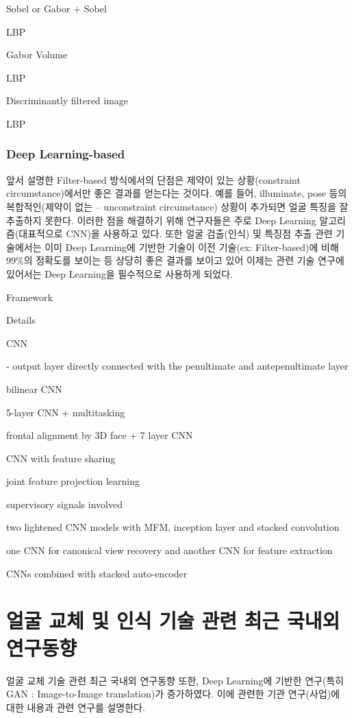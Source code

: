 \documentclass{oblivoir}
\begin{document}
Sobel or Gabor + Sobel

LBP

Gabor Volume

LBP

Discriminantly filtered image

LBP

\subsubsection{ Deep Learning-based}

앞서 설명한 Filter-based 방식에서의 단점은 제약이 있는 상황(constraint circumstance)에서만 좋은 결과를 얻는다는 것이다. 예를 들어, illuminate, pose 등의 복합적인(제약이 없는 – unconstraint circumstance) 상황이 추가되면 얼굴 특징을 잘 추출하지 못한다. 이러한 점을 해결하기 위해 연구자들은 주로 Deep Learning 알고리즘(대표적으로 CNN)을 사용하고 있다. 또한 얼굴 검출(인식) 및 특징점 추출 관련 기술에서는 이미 Deep Learning에 기반한 기술이 이전 기술(ex: Filter-based)에 비해 99\%의 정확도를 보이는 등 상당히 좋은 결과를 보이고 있어 이제는 관련 기술 연구에 있어서는 Deep Learning을 필수적으로 사용하게 되었다.

Framework

Details

CNN

- output layer directly connected with the penultimate and antepenultimate layer

bilinear CNN

5-layer CNN + multitasking

frontal alignment by 3D face + 7 layer CNN

CNN with feature sharing

joint feature projection learning

supervisory signals involved

two lightened CNN models with MFM, inception layer and stacked convolution

one CNN for canonical view recovery and another CNN for feature extraction

CNNs combined with stacked auto-encoder

\section{얼굴 교체 및 인식 기술 관련 최근 국내외 연구동향}

얼굴 교체 기술 관련 최근 국내외 연구동향 또한, Deep Learning에 기반한 연구(특히 GAN : Image-to-Image translation)가 증가하였다. 이에 관련한 기관 연구(사업)에 대한 내용과 관련 연구를 설명한다.
\end{document}
